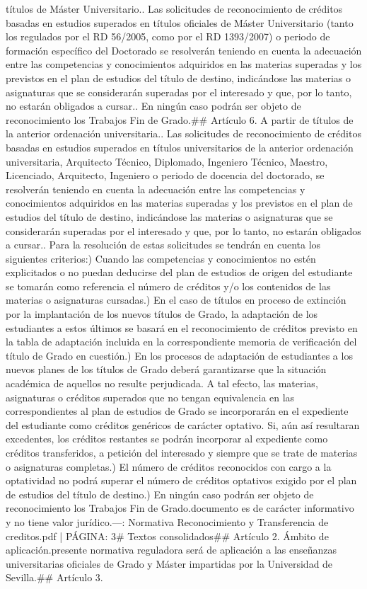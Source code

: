 \documentclass{article}
\begin{document}
\begin{itemize}
{{{{títulos de Máster Universitario.\n{}. Las solicitudes de reconocimiento de créditos basadas en estudios superados en títulos oficiales de Máster Universitario (tanto los regulados por el RD 56/2005, como por el RD 1393/2007) o periodo de formación específico del Doctorado se resolverán teniendo en cuenta la adecuación entre las competencias y conocimientos adquiridos en las materias superadas y los previstos en el plan de estudios del título de destino, indicándose las materias o asignaturas que se considerarán superadas por el interesado y que, por lo tanto, no estarán obligados a cursar.\n{}. En ningún caso podrán ser objeto de reconocimiento los Trabajos Fin de Grado.\n\n## Artículo 6. A partir de títulos de la anterior ordenación universitaria.\n{}. Las solicitudes de reconocimiento de créditos basadas en estudios superados en títulos universitarios de la anterior ordenación universitaria, Arquitecto Técnico, Diplomado, Ingeniero Técnico, Maestro, Licenciado, Arquitecto, Ingeniero o periodo de docencia del doctorado, se resolverán teniendo en cuenta la adecuación entre las competencias y conocimientos adquiridos en las materias superadas y los previstos en el plan de estudios del título de destino, indicándose las materias o asignaturas que se considerarán superadas por el interesado y que, por lo tanto, no estarán obligados a cursar.\n{}. Para la resolución de estas solicitudes se tendrán en cuenta los siguientes criterios:\n{}) Cuando las competencias y conocimientos no estén explicitados o no puedan deducirse del plan de estudios de origen del estudiante se tomarán como referencia el número de créditos y/o los contenidos de las materias o asignaturas cursadas.\n{}) En el caso de títulos en proceso de extinción por la implantación de los nuevos títulos de Grado, la adaptación de los estudiantes a estos últimos se basará en el reconocimiento de créditos previsto en la tabla de adaptación incluida en la correspondiente memoria de verificación del título de Grado en cuestión.\n{}) En los procesos de adaptación de estudiantes a los nuevos planes de los títulos de Grado deberá garantizarse que la situación académica de aquellos no resulte perjudicada. A tal efecto, las materias, asignaturas o créditos superados que no tengan equivalencia en las correspondientes al plan de estudios de Grado se incorporarán en el expediente del estudiante como créditos genéricos de carácter optativo. Si, aún así resultaran excedentes, los créditos restantes se podrán incorporar al expediente como créditos transferidos, a petición del interesado y siempre que se trate de materias o asignaturas completas.\n{}) El número de créditos reconocidos con cargo a la optatividad no podrá superar el número de créditos optativos exigido por el plan de estudios del título de destino.\n{}) En ningún caso podrán ser objeto de reconocimiento los Trabajos Fin de Grado.\n\nEste documento es de carácter informativo y no tiene valor jurídico.\n\n---\n\nFUENTE: Normativa Reconocimiento y Transferencia de creditos.pdf | PÁGINA: 3\n# Textos consolidados\n\n## Artículo 2. Ámbito de aplicación.\nLa presente normativa reguladora será de aplicación a las enseñanzas universitarias oficiales de Grado y Máster impartidas por la Universidad de Sevilla.\n\n## Artículo 3. }}}}
\end{itemize}
\end{document}
